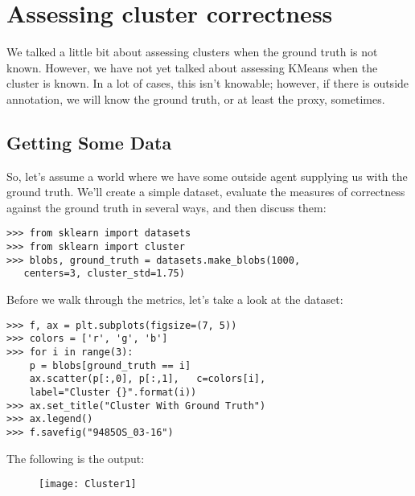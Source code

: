 \documentclass[SKL-MASTER.tex]{subfiles}
\begin{document}
\Large
\section*{Assessing cluster correctness}
We talked a little bit about assessing clusters when the ground truth is not known. However,
we have not yet talked about assessing KMeans when the cluster is known. In a lot of cases,
this isn't knowable; however, if there is outside annotation, we will know the ground truth,
or at least the proxy, sometimes.
\subsection*{Getting Some Data}
So, let's assume a world where we have some outside agent supplying us with the
ground truth.
We'll create a simple dataset, evaluate the measures of correctness against the
ground truth in several ways, and then discuss them:
\begin{framed}
\begin{verbatim}
>>> from sklearn import datasets
>>> from sklearn import cluster
>>> blobs, ground_truth = datasets.make_blobs(1000, 
   centers=3, cluster_std=1.75)
\end{verbatim}
\end{framed}

\noindent Before we walk through the metrics, let's take a look at the dataset:
\begin{framed}
\begin{verbatim}
>>> f, ax = plt.subplots(figsize=(7, 5))
>>> colors = ['r', 'g', 'b']
>>> for i in range(3):
    p = blobs[ground_truth == i]
    ax.scatter(p[:,0], p[:,1],   c=colors[i],
    label="Cluster {}".format(i))
>>> ax.set_title("Cluster With Ground Truth")
>>> ax.legend()
>>> f.savefig("9485OS_03-16")
\end{verbatim}
\end{framed}
The following is the output:
\begin{figure}[h!]
\centering
\texttt{[image: Cluster1]}
\end{figure}
\end{document}
